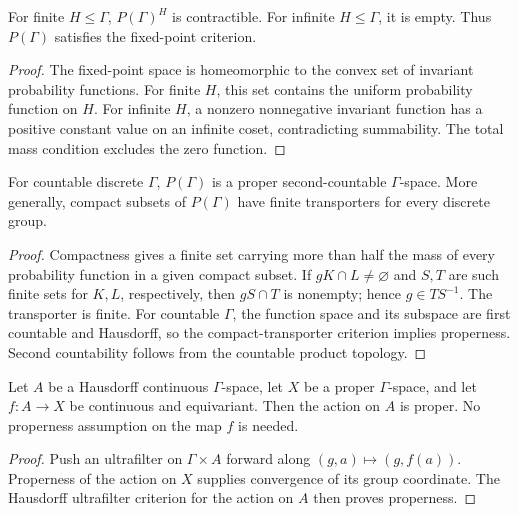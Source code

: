 \begin{proposition}\label{prop:probability-fixed-points}
For finite $H\leq\Gamma$, $P(\Gamma)^H$ is contractible. For infinite
$H\leq\Gamma$, it is empty. Thus $P(\Gamma)$ satisfies the fixed-point criterion.
\end{proposition}
\begin{proof}
\leanok
The fixed-point space is homeomorphic to the convex set of invariant
probability functions. For finite $H$, this set contains the uniform
probability function on $H$. For infinite $H$, a nonzero nonnegative invariant
function has a positive constant value on an infinite coset, contradicting
summability. The total mass condition excludes the zero function.
\end{proof}

\begin{proposition}\label{prop:probability-proper-action}
For countable discrete $\Gamma$, $P(\Gamma)$ is a proper second-countable
$\Gamma$-space. More generally, compact subsets of $P(\Gamma)$ have finite
transporters for every discrete group.
\end{proposition}
\begin{proof}
\leanok
Compactness gives a finite set carrying more than half the mass of every
probability function in a given compact subset. If $gK\cap L\ne\varnothing$
and $S,T$ are such finite sets for $K,L$, respectively, then $gS\cap T$
is nonempty; hence $g\in TS^{-1}$. The transporter is finite.
For countable $\Gamma$, the function space and its subspace are first
countable and Hausdorff, so the compact-transporter criterion implies
properness. Second countability follows from the countable product topology.
\end{proof}

\begin{proposition}\label{prop:properness-equivariant-pullback}
Let $A$ be a Hausdorff continuous $\Gamma$-space, let $X$ be a proper
$\Gamma$-space, and let $f:A\to X$ be continuous and equivariant.
Then the action on $A$ is proper. No properness assumption on the map $f$
is needed.
\end{proposition}
\begin{proof}
\leanok
Push an ultrafilter on $\Gamma\times A$ forward along
$(g,a)\mapsto(g,f(a))$. Properness of the action on $X$ supplies convergence
of its group coordinate. The Hausdorff ultrafilter criterion for the action
on $A$ then proves properness.
\end{proof}

